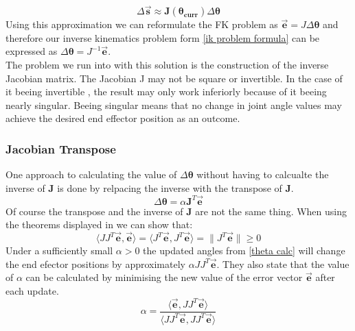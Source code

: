 \begin{equation}
\label{delta s approx}
\Delta\pmb{\vec{s}}\approx \pmb{J(\theta_{curr})}\Delta\pmb{\theta}
\end{equation}
Using this approximation  we can reformulate the FK problem as $\pmb{}\vec{\pmb{e}}=J\Delta\pmb{\theta}$ and therefore our inverse kinematics problem form \ref{ik problem formula} can be expressed as $ \Delta\pmb{\theta}=J^{-1}\vec{\pmb{e}}$. \\The problem we run into with this solution is the construction of the inverse Jacobian matrix. The Jacobian J may not be square or invertible. In the case of it beeing invertible , the result may only work inferiorly because of it beeing nearly singular. Beeing singular means that no change in joint angle values may achieve the desired end effector position as an outcome.
\subsubsection{Jacobian Transpose}
One approach to calculating the value of $\Delta\pmb{\theta}$ without having to calcualte the inverse of \textbf{J} is done by relpacing the inverse with the transpose of \textbf{J}.
\begin{equation}
\label{delta s approx}
\Delta\pmb{\theta}=\alpha \pmb{J}^{T}\vec{\pmb{e}}
\end{equation}
Of course the transpose and the inverse of \textbf{J} are not the same thing. When using the theorems displayed in \cite{.1984b,Wolovich.1984} we can show that: 
\begin{equation}
\label{transpose show}
\langle JJ^{T}\vec{\pmb{e}},\vec{\pmb{e}}\rangle=\langle J^{T}\vec{\pmb{e}},J^{T}\vec{\pmb{e}}\rangle=\|J^{T}\vec{\pmb{e}}\|\geq 0
\end{equation}
Under a sufficiently small $\alpha>0$ the updated angles from \ref{theta calc} will change the end efector positions by approximately $\alpha JJ^{T}\vec{\pmb{e}}$. They also state that 
the value of $\alpha$ can be calculated by minimising the new value of the error vector $\vec{\pmb{e}}$ after each update.
\begin{equation}
\label{transpose show}
\alpha=\frac{\langle\vec{\pmb{e}},JJ^{T}\vec{\pmb{e}}\rangle}{\langle JJ^{T}\vec{\pmb{e}},JJ^{T}\vec{\pmb{e}}\rangle}
\end{equation}
